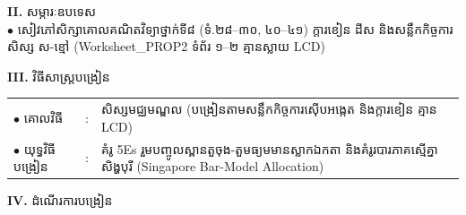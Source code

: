 \documentclass[a4paper,10pt]{article}
\newcommand{\en}[1]{{\TimesEn #1}}
\begin{document}
{%
\textbf{II.} {\muol សម្ភារៈឧបទេស}\\[1pt]
\hspace*{0.55cm}$\bullet$ \hspace{0.35cm} សៀវភៅសិក្សាគោលគណិតវិទ្យាថ្នាក់ទី៨ (ទំ.២៨–៣០, ៤០–៤១) ក្ដារខៀន ដីស និងសន្លឹកកិច្ចការសិស្ស ស-ខ្មៅ (\en{Worksheet\_PROP2} ទំព័រ ១–២ គ្មានស្លាយ \en{LCD})

\vspace{2pt}

\textbf{III.} {\muol វិធីសាស្រ្តបង្រៀន}\\[1pt]
\hspace*{0.45cm}%
\begin{tabular}{@{}l l L{14.85cm}@{}}
  $\bullet$ \hspace{0.25cm} គោលវិធី & : & សិស្សមជ្ឈមណ្ឌល (បង្រៀនតាមសន្លឹកកិច្ចការស៊ើបអង្កេត និងក្ដារខៀន គ្មាន \en{LCD}) \\
  $\bullet$ \hspace{0.25cm} យុទ្ធវិធីបង្រៀន & : & គំរូ \en{5Es} រួមបញ្ចូលស្ពានតួចុង-តួមធ្យមមានស្លាកឯកតា និងគំរូរបារភាគស្មើគ្នាសិង្ហបុរី (\en{Singapore Bar-Model Allocation}) \\
\end{tabular}
}

\vspace{2pt}

\textbf{IV.} {\muol ដំណើរការបង្រៀន}

\vspace{1pt}
\end{document}
